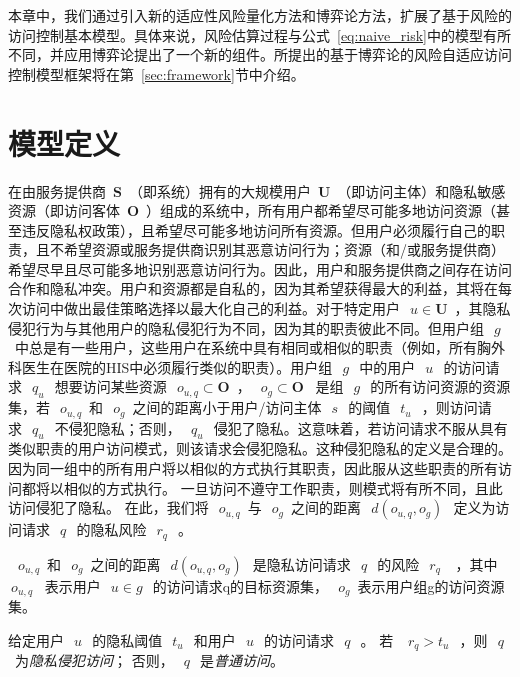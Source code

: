 本章中，我们通过引入新的适应性风险量化方法和博弈论方法，扩展了基于风险的访问控制基本模型。具体来说，风险估算过程与公式~\ref{eq:naive_risk}中的模型有所不同，并应用博弈论提出了一个新的组件。所提出的基于博弈论的风险自适应访问控制模型框架将在第~\ref{sec:framework}节中介绍。


\section{模型定义}
\label{sec:notations}


在由服务提供商~$\mathbf{S}$~（即系统）拥有的大规模用户~$\mathbf{U}$~（即访问主体）和隐私敏感资源（即访问客体~$\mathbf{O}$~）组成的系统中，所有用户都希望尽可能多地访问资源（甚至违反隐私权政策），且希望尽可能多地访问所有资源。但用户必须履行自己的职责，且不希望资源或服务提供商识别其恶意访问行为；资源（和/或服务提供商）希望尽早且尽可能多地识别恶意访问行为。因此，用户和服务提供商之间存在访问合作和隐私冲突。用户和资源都是自私的，因为其希望获得最大的利益，其将在每次访问中做出最佳策略选择以最大化自己的利益。对于特定用户~$~u \in \mathbf{U}$~，其隐私侵犯行为与其他用户的隐私侵犯行为不同，因为其的职责彼此不同。但用户组~$~g~$~中总是有一些用户，这些用户在系统中具有相同或相似的职责（例如，所有胸外科医生在医院的HIS中必须履行类似的职责）。用户组~$~g~$~中的用户~$~u~$~的访问请求~$~q_u~$~想要访问某些资源~$~o_{u,q} \subset \mathbf{O}$~，~$~o_{g} \subset \mathbf{O}$~ 是组~$~g~$~的所有访问资源的资源集，若~$~o_{u,q}$~和~$~o_{g}$~之间的距离小于用户/访问主体~$~s~$~的阈值~$~t_u~$~，则访问请求~$~q_u~$~不侵犯隐私；否则，~$~q_u~$~侵犯了隐私。这意味着，若访问请求不服从具有类似职责的用户访问模式，则该请求会侵犯隐私。这种侵犯隐私的定义是合理的。因为同一组中的所有用户将以相似的方式执行其职责，因此服从这些职责的所有访问都将以相似的方式执行。 一旦访问不遵守工作职责，则模式将有所不同，且此访问侵犯了隐私。 在此，我们将~$~o_{u,q}$~与~$~o_{g}$~之间的距离~$~d(o_{u,q},o_{g})~$~定义为访问请求~$~q~$~的隐私风险~$~r_q~$~。
\begin{definition}
	\label{def:privacy_risk}
	~$~o_{u,q}$~和~$~o_{g}$~之间的距离~$~d(o_{u,q},o_{g})~$~是隐私访问请求~$~q~$~的风险~$~r_q~$~ ，其中~$~o_{u,q}$~ 表示用户~$~u \in g~$~的访问请求q的目标资源集，~$~o_{g}$~表示用户组g的访问资源集。
\end{definition}

\begin{definition}
	\label{def:privacy_violation_access}
	
	给定用户~$~u~$~的隐私阈值~$~t_u~$~和用户~$~u~$~的访问请求~$~q~$~。 若 ~$~r_q > t_u~$~，则~$~q~$~为\textit{隐私侵犯访问}； 否则，~$~q~$~是\textit{普通访问}。
\end{definition}




